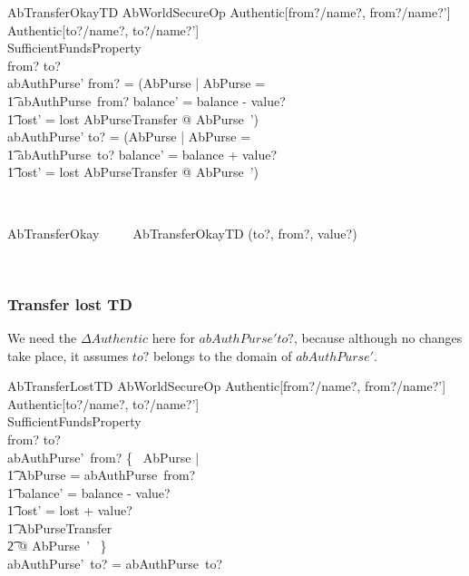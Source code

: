 \begin{LSDef}
\begin{schema}{AbTransferOkayTD}
  AbWorldSecureOp
\where
  \Delta Authentic[from?/name?, from?/name?']\\
  \Delta Authentic[to?/name?, to?/name?']\\
  SufficientFundsProperty\\
  from? \neq to?\\
  abAuthPurse' from? = (\mu  \Delta AbPurse | \theta  AbPurse = \\
      \t1 abAuthPurse~from? \land  balance' = balance - value? \land \\
      \t1 lost' = lost \land  \Xi AbPurseTransfer @ \theta  AbPurse~')\\
  abAuthPurse' to? = (\mu  \Delta AbPurse | \theta  AbPurse = \\
      \t1 abAuthPurse~to? \land  balance' = balance + value? \land  \\
      \t1 lost' = lost \land  \Xi AbPurseTransfer @ \theta  AbPurse~')
\end{schema}~\end{LSDef}

\begin{LSDef}
\begin{zed}
   AbTransferOkay ~~~~ AbTransferOkayTD \hide (to?, from?, value?)
\end{zed}~\end{LSDef}

\subsubsection{Transfer lost TD}

We need the $\Delta Authentic$ here for $abAuthPurse' to?$,
because although no changes take place, it assumes $to?$ belongs
to the domain of $abAuthPurse'$.
%
\begin{LSDef}
\begin{schema}{AbTransferLostTD}
  AbWorldSecureOp
\where
  \Delta Authentic[from?/name?, from?/name?']\\
  \Delta Authentic[to?/name?, to?/name?']\\
  SufficientFundsProperty\\
  from? \neq to?\\
  abAuthPurse'~from? \in \{~ \Delta AbPurse | \\
      \t1 \theta AbPurse = abAuthPurse~from? \\
      \t1 \land balance' = balance - value? \\
      \t1 \land lost' = lost + value? \\
      \t1 \land \Xi AbPurseTransfer \\
      \t2 @ \theta AbPurse~' ~\}\\
  abAuthPurse'~to? = abAuthPurse~to?
\end{schema}~\end{LSDef}

